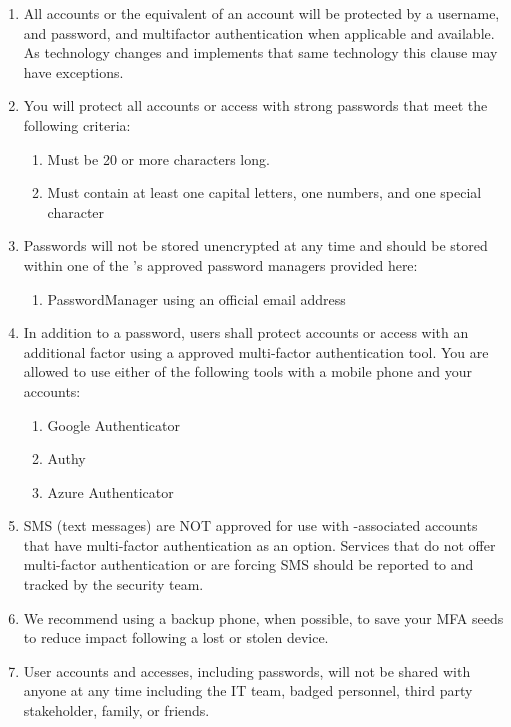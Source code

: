 \documentclass[../main.tex]{subfiles}
\begin{document}
\begin{enumerate}
\begin{enumerate}
        \item All accounts or the equivalent of an account will be protected by a username, and password, and multifactor authentication when applicable and available.
        As technology changes and \CompanyName{} implements that same technology this clause may have exceptions.
        \item You will protect all accounts or access with strong passwords that meet the following criteria:
        \begin{enumerate}
            \item Must be 20 or more characters long.
            \item Must contain at least one capital letters, one numbers, and one special character
        \end{enumerate}
        \item Passwords will not be stored unencrypted at any time and should be stored within one of the \CompanyName's approved password managers provided here:
        \begin{enumerate}
            \item PasswordManager using an official \CompanyName{} email address
        \end{enumerate}
        \item In addition to a password, users shall protect accounts or access with an additional factor using a \CompanyName{} approved multi-factor authentication tool. You are allowed to use either of the following tools with a mobile phone and your \CompanyName{} accounts:
        \begin{enumerate}
            \item Google Authenticator
            \item Authy
            \item Azure Authenticator
        \end{enumerate}
        \item SMS (text messages) are NOT approved for use with \CompanyName-associated accounts that have multi-factor authentication as an option. Services that do not offer multi-factor
        authentication or are forcing SMS should be reported to and tracked by the security team.
        \item We recommend using a backup phone, when possible, to save your MFA seeds to reduce impact following a lost or stolen device.
        \item User accounts and accesses, including passwords, will not be shared with anyone at any time including the IT team, badged personnel, third party stakeholder, family, or friends.

\end{enumerate}
\end{enumerate}
\end{document}
